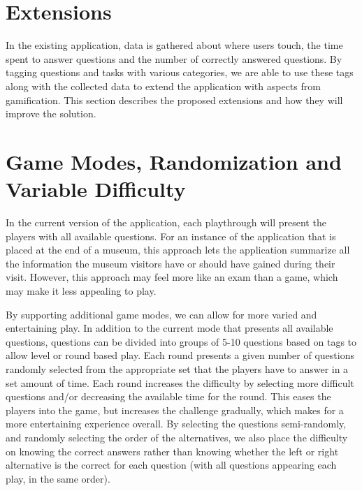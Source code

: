 \section{Extensions}

In the existing application, data is gathered about where users touch, the time spent to answer questions and the number of correctly answered questions. By tagging questions and tasks with various categories, we are able to use these tags along with the collected data to extend the application with aspects from gamification. This section describes the proposed extensions and how they will improve the solution.


\section{Game Modes, Randomization and Variable Difficulty}

In the current version of the application, each playthrough will present the players with all available questions. For an instance of the application that is placed at the end of a museum, this approach lets the application summarize all the information the museum visitors have or should have gained during their visit. However, this approach may feel more like an exam than a game, which may make it less appealing to play.

By supporting additional game modes, we can allow for more varied and entertaining play. In addition to the current mode that presents all available questions, questions can be divided into groups of 5-10 questions based on tags to allow level or round based play. Each round presents a given number of questions randomly selected from the appropriate set that the players have to answer in a set amount of time. Each round increases the difficulty by selecting more difficult questions and/or decreasing the available time for the round. This eases the players into the game, but increases the challenge gradually, which makes for a more entertaining experience overall. By selecting the questions semi-randomly, and randomly selecting the order of the alternatives, we also place the difficulty on knowing the correct answers rather than knowing whether the left or right alternative is the correct for each question (with all questions appearing each play, in the same order).

